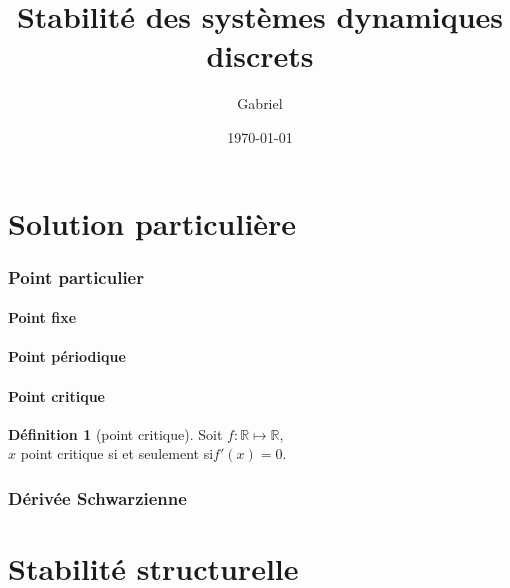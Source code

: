 \documentclass{article}
\title{Stabilité des systèmes dynamiques discrets}
\author{Gabriel \bsc{Hondet}}
\date{\today}
\newcommand\ssi{si et seulement si\xspace}
\theoremstyle{definition}
\newtheorem{defn}{Définition}
\theoremstyle{plain}
\theoremstyle{remark}
\begin{document}
\maketitle
\tableofcontents

\part{Solution particulière}
\section{Point particulier}
\subsection{Point fixe}
\subsection{Point périodique}
\subsection{Point critique}
\begin{defn}[point critique]
    Soit $f:\mathbb{R}\mapsto \mathbb{R}$,\\
    $x$ point critique \ssi $f'(x) = 0$.
\end{defn}
\section{Dérivée Schwarzienne}

\part{Stabilité structurelle}
\end{document}
